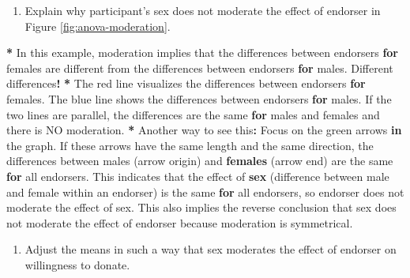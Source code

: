 \documentclass[a4paper]{book}
\newenvironment{Shaded}{\begin{snugshade}}{\end{snugshade}}
\newcommand{\KeywordTok}[1]{\textcolor[rgb]{0,0,0}{\textbf{#1}}}
\newcommand{\StringTok}[1]{\textcolor[rgb]{0.00,0.00,0.00}{#1}}
\newcommand{\ControlFlowTok}[1]{\textcolor[rgb]{0.00,0.00,0.00}{\textbf{#1}}}
\newcommand{\OperatorTok}[1]{\textcolor[rgb]{0.00,0.00,0.00}{\textbf{#1}}}
\newcommand{\ErrorTok}[1]{\textcolor[rgb]{0.00,0.00,0.00}{\textbf{#1}}}
\newcommand{\NormalTok}[1]{#1}
\providecommand{\tightlist}{%
  \setlength{\itemsep}{0pt}\setlength{\parskip}{0pt}}
\theoremstyle{definition}
\theoremstyle{definition}
\theoremstyle{definition}
\theoremstyle{remark}
\begin{document}
\begin{enumerate}
\def\labelenumi{\arabic{enumi}.}
\setcounter{enumi}{2}
\tightlist
\item
  Explain why participant's sex does not moderate the effect of endorser
  in Figure \ref{fig:anova-moderation}.
\end{enumerate}

\begin{Shaded}
\begin{Highlighting}[]
\OperatorTok{*}\StringTok{ }\NormalTok{In this example, moderation implies that the differences between endorsers}
\ControlFlowTok{for}\NormalTok{ females are different from the differences between endorsers }\ControlFlowTok{for}\NormalTok{ males.}
\NormalTok{Different differences}\OperatorTok{!}
\ErrorTok{*}\StringTok{ }\NormalTok{The red line visualizes the differences between endorsers }\ControlFlowTok{for}\NormalTok{ females. The}
\NormalTok{blue line shows the differences between endorsers }\ControlFlowTok{for}\NormalTok{ males. If the two lines}
\NormalTok{are parallel, the differences are the same }\ControlFlowTok{for}\NormalTok{ males and females and there is}
\NormalTok{NO moderation.}
\OperatorTok{*}\StringTok{ }\NormalTok{Another way to see this}\OperatorTok{:}\StringTok{ }\NormalTok{Focus on the green arrows }\ControlFlowTok{in}\NormalTok{ the graph. If these arrows}
\NormalTok{have the same length and the same direction, the differences between males}
\NormalTok{(arrow origin) and }\KeywordTok{females}\NormalTok{ (arrow end) are the same }\ControlFlowTok{for}\NormalTok{ all endorsers. This}
\NormalTok{indicates that the effect of }\KeywordTok{sex}\NormalTok{ (difference between male and female within an}
\NormalTok{endorser) is the same }\ControlFlowTok{for}\NormalTok{ all endorsers, so endorser does not moderate the}
\NormalTok{effect of sex. This also implies the reverse conclusion that sex does not}
\NormalTok{moderate the effect of endorser because moderation is symmetrical.}
\end{Highlighting}
\end{Shaded}

\begin{enumerate}
\def\labelenumi{\arabic{enumi}.}
\setcounter{enumi}{3}
\tightlist
\item
  Adjust the means in such a way that sex moderates the effect of
  endorser on willingness to donate.
\end{enumerate}
\end{document}
